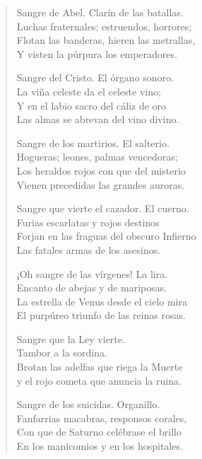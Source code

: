 \documentclass[12pt]{article}
\begin{document}
\clearpage
{}
\begin{verse}

Sangre de Abel. Clarín de las batallas.\\
Luchas fraternales; estruendos, horrores;\\
Flotan las banderas, hieren las metrallas,\\
Y visten la púrpura los emperadores.  

Sangre del Cristo. El órgano sonoro.\\
La viña celeste da el celeste vino;\\
Y en el labio sacro del cáliz de oro\\
Las almas se abrevan del vino divino.  

Sangre de los martirios. El salterio.\\
Hogueras; leones, palmas vencedoras;\\
Los heraldos rojos con que del misterio\\
Vienen precedidas las grandes auroras.  

Sangre que vierte el cazador. El cuerno.\\
Furias escarlatas y rojos destinos\\
Forjan en las fraguas del obscuro Infierno\\
Las fatales armas de los asesinos.  

¡Oh sangre de las vírgenes! La lira.\\
Encanto de abejas y de mariposas.\\
La estrella de Venus desde el cielo mira\\
El purpúreo triunfo de las reinas rosas.  

Sangre que la Ley vierte.\\
Tambor a la sordina.\\
Brotan las adelfas que riega la Muerte\\
y el rojo cometa que anuncia la ruina.  

Sangre de los suicidas. Organillo.\\
Fanfarrias macabras, responsos corales,\\
Con que de Saturno celébrase el brillo\\
En los manicomios y en los hospitales.  

\end{verse}
\end{document}
